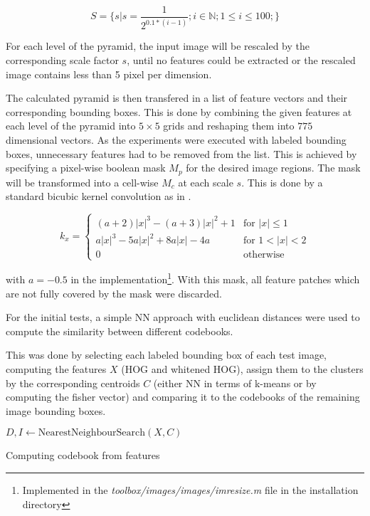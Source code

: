 \begin{equation}
S = \{s|s = \frac{1}{2^{0.1 * (i-1)}}; i \in \mathbb{N}; 1 \le i \le 100;\}
\end{equation}

For each level of the pyramid, the input image will be rescaled by the corresponding scale factor $s$, until no features could be extracted or the rescaled image contains less than 5 pixel per dimension.
\par
The calculated pyramid is then transfered in a list of feature vectors and their corresponding bounding boxes. This is done by combining the given features at each level of the pyramid into $5\times5$ grids and reshaping them into $775$ dimensional vectors.
As the experiments were executed with labeled bounding boxes, unnecessary features had to be removed from the list. This is achieved by specifying a pixel-wise boolean mask $M_p$ for the desired image regions. The mask will be transformed into a cell-wise $M_c$ at each scale $s$. This is done by a standard bicubic kernel convolution as in .

\begin{equation}
k_x = \begin{cases}
(a+2)|x|^3-(a+3)|x|^2+1 & \text{for } |x| \leq 1 \\
a|x|^3-5a|x|^2+8a|x|-4a & \text{for } 1 < |x| < 2 \\
0                       & \text{otherwise}
\end{cases}
\label{eqn:bicubic_kernel}
\end{equation}

with $a=-0.5$ in the \MATLAB implementation\footnote{Implemented in the \textit{toolbox/images/images/imresize.m} file in the \MATLAB installation directory}. With this mask, all feature patches which are not fully covered by the mask were discarded.
\par
For the initial tests, a simple \acf{NN} approach with euclidean distances were used to compute the similarity between different codebooks.

This was done by selecting each labeled bounding box of each test image, computing the features $X$ (\ac{HOG} and whitened \ac{HOG}), assign them to the clusters by the corresponding centroids $C$ (either \ac{NN} in terms of k-means or by computing the fisher vector) and comparing it to the codebooks of the remaining image bounding boxes.

\begin{algorithm}
	$D, I \gets \text{NearestNeighbourSearch}(X, C)$\;
	
	\caption{Computing codebook from features}
	\label{alg:codebook_calc}
\end{algorithm}

